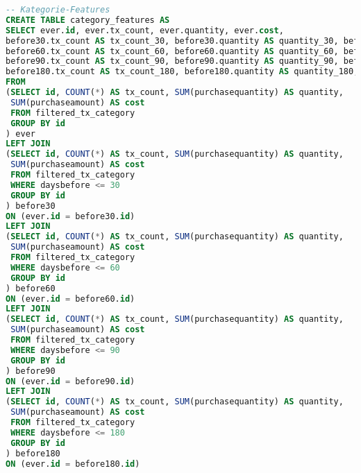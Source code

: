 \begin{lstlisting}[language=SQL]
-- Kategorie-Features
CREATE TABLE category_features AS
SELECT ever.id, ever.tx_count, ever.quantity, ever.cost,
before30.tx_count AS tx_count_30, before30.quantity AS quantity_30, before30.cost AS cost_30,
before60.tx_count AS tx_count_60, before60.quantity AS quantity_60, before60.cost AS cost_60,
before90.tx_count AS tx_count_90, before90.quantity AS quantity_90, before90.cost AS cost_90,
before180.tx_count AS tx_count_180, before180.quantity AS quantity_180, before180.cost AS cost_180
FROM 
(SELECT id, COUNT(*) AS tx_count, SUM(purchasequantity) AS quantity, 
 SUM(purchaseamount) AS cost
 FROM filtered_tx_category
 GROUP BY id
) ever
LEFT JOIN
(SELECT id, COUNT(*) AS tx_count, SUM(purchasequantity) AS quantity, 
 SUM(purchaseamount) AS cost
 FROM filtered_tx_category
 WHERE daysbefore <= 30
 GROUP BY id
) before30
ON (ever.id = before30.id)
LEFT JOIN
(SELECT id, COUNT(*) AS tx_count, SUM(purchasequantity) AS quantity, 
 SUM(purchaseamount) AS cost
 FROM filtered_tx_category
 WHERE daysbefore <= 60
 GROUP BY id
) before60
ON (ever.id = before60.id)
LEFT JOIN
(SELECT id, COUNT(*) AS tx_count, SUM(purchasequantity) AS quantity, 
 SUM(purchaseamount) AS cost
 FROM filtered_tx_category
 WHERE daysbefore <= 90
 GROUP BY id
) before90
ON (ever.id = before90.id)
LEFT JOIN 
(SELECT id, COUNT(*) AS tx_count, SUM(purchasequantity) AS quantity, 
 SUM(purchaseamount) AS cost
 FROM filtered_tx_category
 WHERE daysbefore <= 180
 GROUP BY id
) before180
ON (ever.id = before180.id)
\end{lstlisting}

